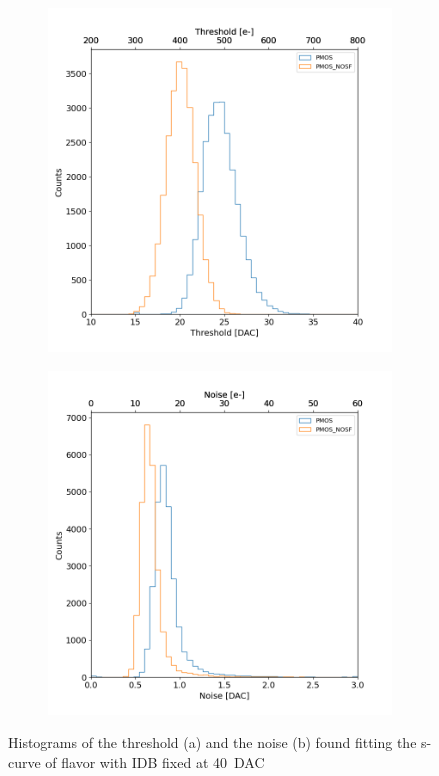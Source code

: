         \begin{figure}[h!]
                \begin{subfigure}{.5\textwidth}
                \centering
                \includegraphics[width=.99\linewidth]{figures/charaterization/threshold_histogram.png}
                \end{subfigure}
                \begin{subfigure}{.5\textwidth}
                \centering
                \includegraphics[width=.99\linewidth]{figures/charaterization/noise_histogram.png}
                \end{subfigure}
                \label{fig:threshold_noise_hist}
                \caption{Histograms of the threshold (a) and the noise (b) found fitting the s-curve of  flavor with IDB fixed at \SI{40}{DAC} }
            \end{figure}            
           
